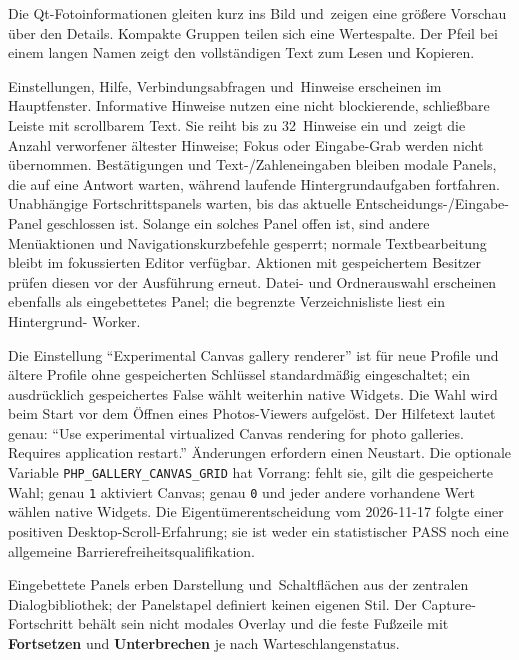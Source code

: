 \documentclass[11pt,a4paper]{article}
\newcommand{\ui}[1]{\textbf{#1}}
\newcommand{\codeword}[1]{\nolinkurl{#1}}
\begin{document}
Die Qt-Fotoinformationen gleiten kurz ins Bild und~zeigen eine größere Vorschau
über den Details. Kompakte Gruppen teilen sich eine Wertespalte. Der Pfeil bei
einem langen Namen zeigt den vollständigen Text zum Lesen und Kopieren.

Einstellungen, Hilfe, Verbindungsabfragen und~Hinweise erscheinen im
Hauptfenster. Informative Hinweise nutzen eine nicht blockierende, schließbare
Leiste mit scrollbarem Text. Sie reiht bis zu 32~Hinweise ein und~zeigt die
Anzahl verworfener ältester Hinweise; Fokus oder Eingabe-Grab werden nicht
übernommen. Bestätigungen und Text-/Zahleneingaben bleiben modale Panels, die
auf eine Antwort warten, während laufende Hintergrundaufgaben fortfahren.
Unabhängige Fortschrittspanels warten, bis das aktuelle Entscheidungs-/Eingabe-
Panel geschlossen ist. Solange ein solches Panel offen ist, sind andere
Menüaktionen und Navigationskurzbefehle gesperrt; normale Textbearbeitung bleibt im
fokussierten Editor verfügbar. Aktionen mit gespeichertem Besitzer prüfen
diesen vor der Ausführung erneut. Datei- und Ordnerauswahl erscheinen ebenfalls
als eingebettetes Panel; die begrenzte Verzeichnisliste liest ein Hintergrund-
Worker.

Die Einstellung “Experimental Canvas gallery renderer” ist für neue Profile
und ältere Profile ohne gespeicherten Schlüssel standardmäßig eingeschaltet;
ein ausdrücklich gespeichertes False wählt weiterhin native Widgets.
Die Wahl wird beim Start vor dem Öffnen eines Photos-Viewers aufgelöst.
Der Hilfetext lautet genau:
“Use experimental virtualized Canvas rendering for photo galleries.
Requires application restart.” Änderungen erfordern einen Neustart. Die optionale
Variable \codeword{PHP_GALLERY_CANVAS_GRID} hat Vorrang: fehlt sie, gilt die
gespeicherte Wahl; genau \codeword{1} aktiviert Canvas; genau \codeword{0}
und jeder andere vorhandene Wert wählen native Widgets. Die Eigentümerentscheidung
vom 2026-11-17 folgte einer positiven Desktop-Scroll-Erfahrung; sie ist weder
ein statistischer PASS noch eine allgemeine Barrierefreiheitsqualifikation.

Eingebettete Panels erben Darstellung und~Schaltflächen aus der zentralen
Dialogbibliothek; der Panelstapel definiert keinen eigenen Stil. Der
Capture-Fortschritt behält sein nicht modales Overlay und die feste Fußzeile
mit \ui{Fortsetzen} und \ui{Unterbrechen} je nach Warteschlangenstatus.
\end{document}
